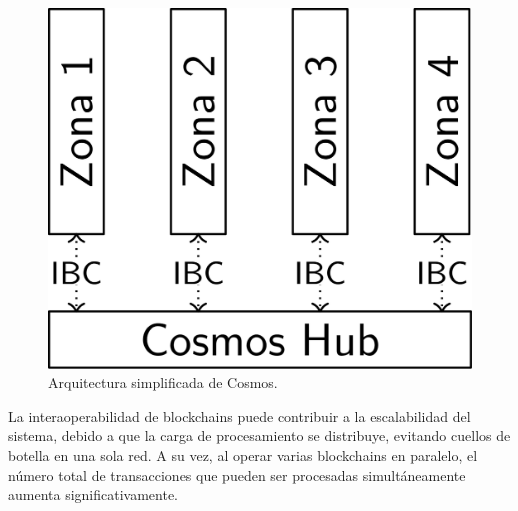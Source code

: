 \begin{figure}[!h]
  \centering
  \includegraphics[scale=0.12]{figures/cosmos.png}
  \caption{Arquitectura simplificada de Cosmos.}
  \label{fig:cosmos}
\end{figure}

La interaoperabilidad de blockchains puede contribuir a la escalabilidad del sistema, debido a que 
la carga de procesamiento se distribuye, evitando cuellos de botella en una sola red.
%
A su vez, al operar varias blockchains en paralelo, el número total de transacciones que
pueden ser procesadas simultáneamente aumenta significativamente.



